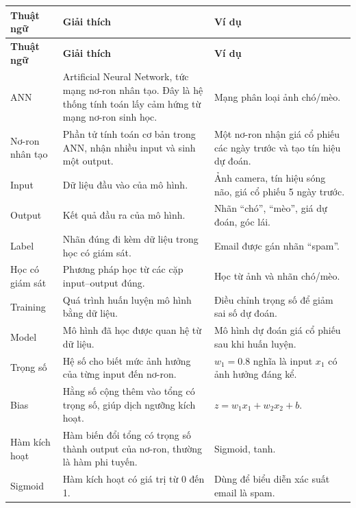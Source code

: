 \documentclass[12pt,a4paper]{report}
\begin{document}
\small
\begin{longtable}{p{}p{}p{}}
\toprule
\textbf{Thuật ngữ} & \textbf{Giải thích} & \textbf{Ví dụ} \\
\midrule
\endfirsthead

\toprule
\textbf{Thuật ngữ} & \textbf{Giải thích} & \textbf{Ví dụ} \\
\midrule
\endhead

ANN & Artificial Neural Network, tức mạng nơ-ron nhân tạo. Đây là hệ thống tính toán lấy cảm hứng từ mạng nơ-ron sinh học. & Mạng phân loại ảnh chó/mèo. \\

Nơ-ron nhân tạo & Phần tử tính toán cơ bản trong ANN, nhận nhiều input và sinh một output. & Một nơ-ron nhận giá cổ phiếu các ngày trước và tạo tín hiệu dự đoán. \\

Input & Dữ liệu đầu vào của mô hình. & Ảnh camera, tín hiệu sóng não, giá cổ phiếu 5 ngày trước. \\

Output & Kết quả đầu ra của mô hình. & Nhãn ``chó'', ``mèo'', giá dự đoán, góc lái. \\

Label & Nhãn đúng đi kèm dữ liệu trong học có giám sát. & Email được gán nhãn ``spam''. \\

Học có giám sát & Phương pháp học từ các cặp input--output đúng. & Học từ ảnh và nhãn chó/mèo. \\

Training & Quá trình huấn luyện mô hình bằng dữ liệu. & Điều chỉnh trọng số để giảm sai số dự đoán. \\

Model & Mô hình đã học được quan hệ từ dữ liệu. & Mô hình dự đoán giá cổ phiếu sau khi huấn luyện. \\

Trọng số & Hệ số cho biết mức ảnh hưởng của từng input đến nơ-ron. & $w_1=0.8$ nghĩa là input $x_1$ có ảnh hưởng đáng kể. \\

Bias & Hằng số cộng thêm vào tổng có trọng số, giúp dịch ngưỡng kích hoạt. & $z=w_1x_1+w_2x_2+b$. \\

Hàm kích hoạt & Hàm biến đổi tổng có trọng số thành output của nơ-ron, thường là hàm phi tuyến. & Sigmoid, tanh. \\

Sigmoid & Hàm kích hoạt có giá trị từ 0 đến 1. & Dùng để biểu diễn xác suất email là spam. \\


\end{longtable}
\end{document}
